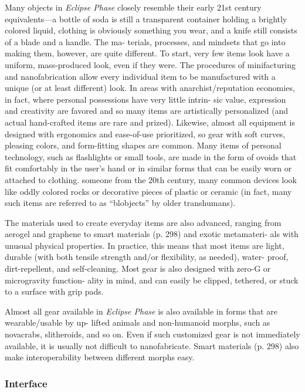 Many objects in \textit{Eclipse Phase} closely resemble their 
early 21st century equivalents—a bottle of soda is still 
a transparent container holding a brightly colored 
liquid, clothing is obviously something you wear, and 
a knife still consists of a blade and a handle. The ma-
terials, processes, and mindsets that go into making 
them, however, are quite different. To start, very few 
items look have a uniform, mass-produced look, even 
if they were. The procedures of minifacturing and 
nanofabrication allow every individual item to be 
manufactured with a unique (or at least different) 
look. In areas with anarchist/reputation economies, in 
fact, where personal possessions have very little intrin-
sic value, expression and creativity are favored and so 
many items are artistically personalized (and actual 
hand-crafted items are rare and prized). Likewise, 
almost all equipment is designed with ergonomics 
and ease-of-use prioritized, so gear with soft curves, 
pleasing colors, and form-fitting shapes are common. 
Many items of personal technology, such as flashlights 
or small tools, are made in the form of ovoids that 
fit comfortably in the user's hand or in similar forms 
that can be easily worn or attached to clothing.
someone from the 20th century, many common 
devices look like oddly colored rocks or decorative 
pieces of plastic or ceramic (in fact, many such items 
are referred to as ``blobjects'' by older transhumans).

The materials used to create everyday items are 
also advanced, ranging from aerogel and graphene 
to smart materials (p. 298) and exotic metamateri-
als with unusual physical properties. In practice, this 
means that most items are light, durable (with both 
tensile strength and/or flexibility, as needed), water-
proof, dirt-repellent, and self-cleaning. Most gear is 
also designed with zero-G or microgravity function-
ality in mind, and can easily be clipped, tethered, or 
stuck to a surface with grip pads.

Almost all gear available in \textit{Eclipse Phase} is also 
available in forms that are wearable/usable by up-
lifted animals and non-humanoid morphs, such 
as novacrabs, slitheroids, and so on. Even if such 
customized gear is not immediately available, it is 
usually not difficult to nanofabricate. Smart materials 
(p. 298) also make interoperability between different 
morphs easy.

\subsubsection{Interface}

